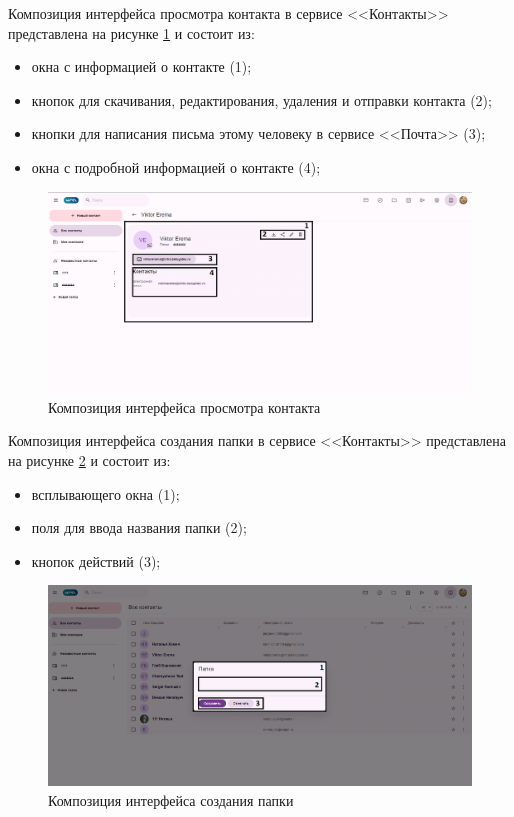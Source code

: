 Композиция интерфейса просмотра контакта в сервисе <<Контакты>> представлена на рисунке \ref{templ:image5b} и состоит из:
\begin{itemize}
  \item окна с информацией о контакте (1);
  \item кнопок для скачивания, редактирования, удаления и отправки контакта (2);
  \item кнопки для написания письма этому человеку в сервисе <<Почта>> (3);
  \item окна с подробной информацией о контакте (4);
\end{itemize}
\begin{figure}[H]
	\centering
	\includegraphics[width=1\linewidth]{images/контакты3}
	\caption{Композиция интерфейса просмотра контакта}
	\label{templ:image5b}
\end{figure}

Композиция интерфейса создания папки в сервисе <<Контакты>> представлена на рисунке \ref{templ:image5c} и состоит из:
\begin{itemize}
  \item всплывающего окна (1);
  \item поля для ввода названия папки (2);
  \item кнопок действий (3);
\end{itemize}
\begin{figure}[H]
	\centering
	\includegraphics[width=1\linewidth]{images/контакты4}
	\caption{Композиция интерфейса создания папки}
	\label{templ:image5c}
\end{figure}

